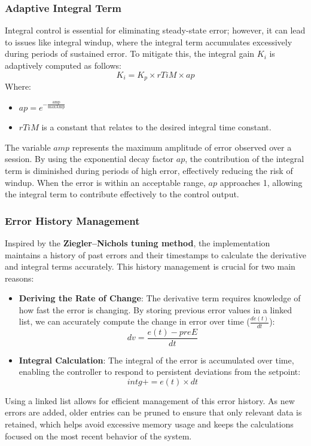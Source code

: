 \documentclass[a4paper,12pt]{article}
\begin{document}
\subsubsection{Adaptive Integral Term}
Integral control is essential for eliminating steady-state error; however, it can lead to issues like integral windup, where the integral term accumulates excessively during periods of sustained error. To mitigate this, the integral gain $K_i$ is adaptively computed as follows:
$$
K_i = K_p \times rTiM \times ap
$$
Where:
\begin{itemize}
\item $ap = e^{-\frac{\text{amp}}{\text{maxAmp}}}$
\item $rTiM$ is a constant that relates to the desired integral time constant.
\end{itemize}
The variable $amp$ represents the maximum amplitude of error observed over a session. By using the exponential decay factor $ap$, the contribution of the integral term is diminished during periods of high error, effectively reducing the risk of windup. When the error is within an acceptable range, $ap$ approaches 1, allowing the integral term to contribute effectively to the control output.
\subsubsection{Error History Management}
Inspired by the \textbf{Ziegler–Nichols tuning method}, the implementation maintains a history of past errors and their timestamps to calculate the derivative and integral terms accurately. This history management is crucial for two main reasons:
\begin{itemize}
\item \textbf{Deriving the Rate of Change}: The derivative term requires knowledge of how fast the error is changing. By storing previous error values in a linked list, we can accurately compute the change in error over time ($\frac{de(t)}{dt}$):
$$
  dv = \frac{e(t) - preE}{dt}
$$
\item \textbf{Integral Calculation}: The integral of the error is accumulated over time, enabling the controller to respond to persistent deviations from the setpoint:
$$
  intg += e(t) \times dt
$$
\end{itemize}
Using a linked list allows for efficient management of this error history. As new errors are added, older entries can be pruned to ensure that only relevant data is retained, which helps avoid excessive memory usage and keeps the calculations focused on the most recent behavior of the system.
\end{document}
